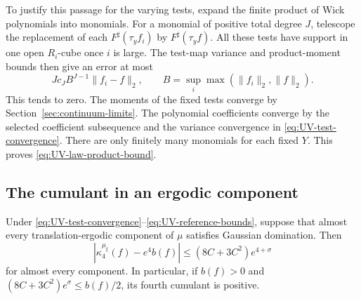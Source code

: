 To justify this passage for the varying tests, expand the finite
product of Wick polynomials into monomials. For a monomial
of positive total degree $J$, telescope the replacement of each
$F^\sharp(\tau_y f_i)$ by $F^\sharp(\tau_y f)$.
All these tests have support in one open $R_i$-cube once $i$
is large. The test-map variance and product-moment bounds
then give an error at most
\[
 Jc_J B^{J-1}\|f_i-f\|_2,
 \qquad B=\sup_i\max(\|f_i\|_2,\|f\|_2).
\]
This tends to zero. The moments of the fixed tests converge
by Section~\ref{sec:continuum-limits}. The polynomial coefficients
converge by the selected coefficient subsequence and the
variance convergence in \eqref{eq:UV-test-convergence}.
There are only finitely many monomials for each fixed $Y$.
This proves \eqref{eq:UV-law-product-bound}.

\subsection{The cumulant in an ergodic component}

\begin{proposition}\label{prop:UV-component-cumulant}
Under \eqref{eq:UV-test-convergence}--\eqref{eq:UV-reference-bounds},
suppose that almost every translation-ergodic component of $\mu$
satisfies Gaussian domination. Then
\begin{equation}\label{eq:UV-component-cumulant}
 \left|\kappa_4^{\mu_\xi}(f)-e^4b(f)\right|
                 \le(8C+3C^2)e^{4+\sigma}
\end{equation}
for almost every component. In particular, if $b(f)>0$ and
$(8C+3C^2)e^\sigma\le b(f)/2$, its fourth cumulant is positive.
\end{proposition}

